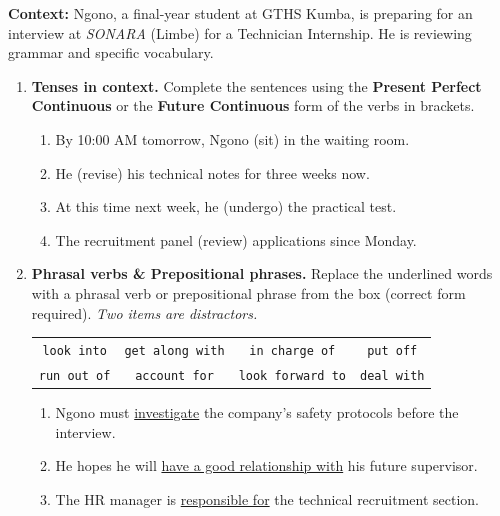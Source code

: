 \documentclass[11pt]{article}
\begin{document}
\begin{exercice}
\textbf{Context:} Ngono, a final-year student at GTHS Kumba, is preparing for an interview at \textit{SONARA} (Limbe) for a Technician Internship. He is reviewing grammar and specific vocabulary.

\begin{enumerate}
    \item \textbf{Tenses in context.} Complete the sentences using the \textbf{Present Perfect Continuous} or the \textbf{Future Continuous} form of the verbs in brackets.
    \begin{enumerate}
        \item By 10:00 AM tomorrow, Ngono \underline{\hspace{3cm}} (sit) in the waiting room.
        \item He \underline{\hspace{3cm}} (revise) his technical notes for three weeks now.
        \item At this time next week, he \underline{\hspace{3cm}} (undergo) the practical test.
        \item The recruitment panel \underline{\hspace{3cm}} (review) applications since Monday.
    \end{enumerate}
    \item \textbf{Phrasal verbs \& Prepositional phrases.} Replace the underlined words with a phrasal verb or prepositional phrase from the box (correct form required). \textit{Two items are distractors.}
    \begin{center}
    \begin{tabular}{cccc}
    \texttt{look into} & \texttt{get along with} & \texttt{in charge of} & \texttt{put off} \\
    \texttt{run out of} & \texttt{account for} & \texttt{look forward to} & \texttt{deal with}
    \end{tabular}
    \end{center}
    \begin{enumerate}
        \item Ngono must \underline{investigate} the company's safety protocols before the interview.
        \item He hopes he will \underline{have a good relationship with} his future supervisor.
        \item The HR manager is \underline{responsible for} the technical recruitment section.

\end{enumerate}
\end{enumerate}
\end{exercice}
\end{document}
